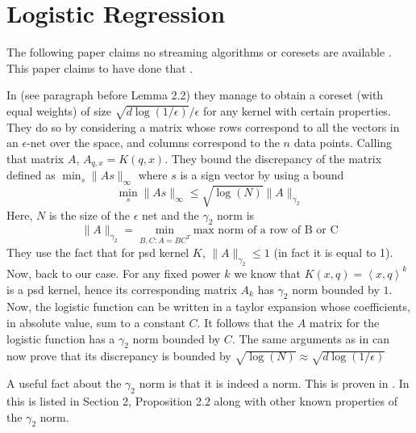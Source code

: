 \documentclass[anon,12pt]{colt2019} %
\newcommand{\ip}[1]{\left \langle #1 \right \rangle}
\newcommand{\eps}{\epsilon}
\begin{document}
\section{Logistic Regression}
The following paper claims no streaming algorithms or coresets are available \cite{DBLP:journals/corr/abs-1805-08571}.
This paper claims to have done that \cite{DBLP:conf/nips/HugginsCB16}.

In \cite{DBLP:journals/corr/abs-1802-01751} (see paragraph before Lemma 2.2) they manage to obtain a coreset (with equal weights) of size $\sqrt{d \log(1/\eps)}/\eps$ for any kernel with certain properties. They do so by considering a matrix whose rows correspond to all the vectors in an $\eps$-net over the space, and columns correspond to the $n$ data points. Calling that matrix $A$, $A_{q,x} = K(q,x)$. They bound the discrepancy of the matrix defined as $\min_s \|As\|_\infty$ where $s$ is a sign vector by using a bound 
$$ \min_s \|As\|_\infty \leq \sqrt{\log(N)} \|A\|_{\gamma_2} $$
Here, $N$ is the size of the $\eps$ net and the $\gamma_2$ norm is 
$$ \|A\|_{\gamma_2} = \min_{B,C: A=BC^T} \text{max norm of a row of B or C}$$
They use the fact that for psd kernel $K$, $\|A\|_{\gamma_2} \leq 1$ (in fact it is equal to 1). Now, back to our case. For any fixed power $k$ we know that $K(x,q)=\ip{x,q}^k$ is a psd kernel, hence its corresponding matrix $A_k$ has $\gamma_2$ norm bounded by $1$. Now, the logistic function can be written in a taylor expansion whose coefficients, in absolute value, sum to a constant $C$. It follows that the $A$ matrix for the logistic function has a $\gamma_2$ norm bounded by $C$. The same arguments as in  \cite{DBLP:journals/corr/abs-1802-01751} can now prove that its discrepancy is bounded by $\sqrt{\log(N)} \approx \sqrt{d\log(1/\eps)}$

A useful fact about the $\gamma_2$ norm is that it is indeed a norm. This is proven in \cite{tomczak1989banach}. In \cite{matouvsek2014factorization} this is listed in Section 2, Proposition 2.2 along with other known properties of the $\gamma_2$ norm. 

\end{document}
